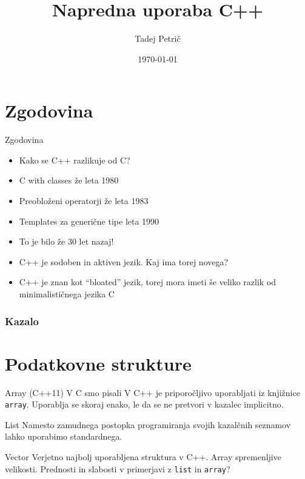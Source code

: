 \documentclass{beamer}
\title{Napredna uporaba C++}
\author{Tadej Petrič}
\date{\today}
\begin{document}
\beamertemplatenavigationsymbolsempty
{}
\begin{frame}[plain]
  \titlepage{}
\end{frame}

\section{Zgodovina}
\begin{frame}[plain]{Zgodovina}
  \begin{itemize}
\item<1-> Kako se C++ razlikuje od C?
\item<2-> C with classes že leta 1980
\item<2-> Preobloženi operatorji že leta 1983
\item<2-> Templates za generične tipe leta 1990
\item<3-> To je bilo že 30 let nazaj!
\item<3-> C++ je sodoben in aktiven jezik. Kaj ima torej novega?
\item<3-> C++ je znan kot ``bloated'' jezik, torej mora imeti še veliko razlik od minimalističnega jezika C
  \end{itemize}
\end{frame}

\begin{frame}[plain]
  \frametitle{Kazalo}
  \tableofcontents
\end{frame}

\section{Podatkovne strukture}
\begin{frame}{Array (C++11)}
  V C smo pisali
  V C++ je priporočljivo uporabljati
  iz knjižnice \texttt{array}.
  Uporablja se skoraj enako, le da se ne pretvori v kazalec implicitno.
\end{frame}

\begin{frame}{List}
  Namesto zamudnega postopka programiranja svojih kazalčnih seznamov lahko uporabimo standardnega.
\end{frame}

\begin{frame}{Vector}
  Verjetno najbolj uporabljena struktura v C++. Array spremenljive velikosti.
  Prednosti in slabosti v primerjavi z \texttt{list} in \texttt{array}?
\end{frame}
\end{document}
